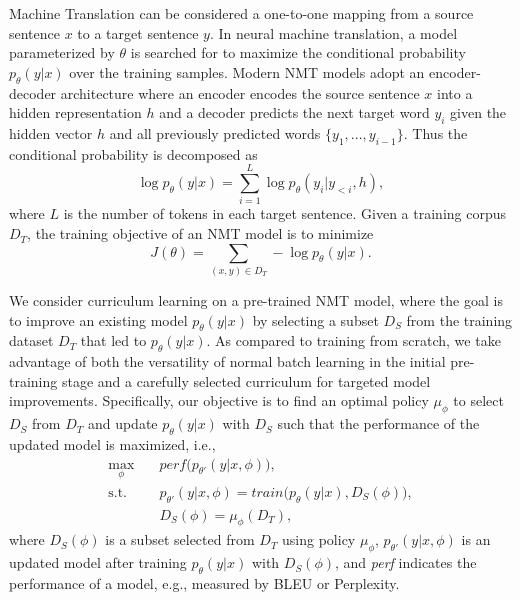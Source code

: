 \documentclass[letterpaper]{article}
\begin{document}
Machine Translation can be considered a one-to-one mapping from a source sentence $x$ to a target sentence $y$. In neural machine translation, a model parameterized by $\theta$ is searched for to maximize the conditional probability $p_\theta(y|x)$ over the training samples.
Modern NMT models adopt an encoder-decoder architecture where an encoder encodes the source sentence $x$ into a hidden representation $h$ and a decoder predicts the next target word $y_i$ given the hidden vector $h$ and all previously predicted words $\{y_1,...,y_{i-1}\}$. Thus the conditional probability is decomposed as
\begin{equation}
	\label{eq:nmtDecompose}
	\log p_\theta(y|x)=\sum_{i=1}^L \log p_\theta(y_i|y_{<i},h),
\end{equation}
where $L$ is the number of tokens in each target sentence. Given a training corpus $D_T$, the training objective of an NMT model is to minimize
\begin{equation}
	\label{eq:nmtObjective}
	J(\theta) = \sum_{(x,y)\in D_T} -\log p_\theta(y|x).
\end{equation}

We consider curriculum learning on a pre-trained NMT model, where the goal is to improve an existing model $p_\theta(y|x)$ by selecting a subset $D_S$ from the training dataset $D_T$ that led to $p_\theta(y|x)$. As compared to training from scratch, we take advantage of both the versatility of normal batch learning in the initial pre-training stage and a carefully selected curriculum for targeted model improvements. 
Specifically, our objective is to find an optimal policy $\mu_\phi$ to select $D_S$ from $D_T$ and update $p_\theta(y|x)$ with $D_S$ such that the performance of the updated model is maximized, i.e., 
\begin{equation}
\begin{aligned}
		\max_\phi &\quad \textit{perf}\Big(p_{\theta'}(y|x,\phi)\Big),\\
		\text{s.t.} & \quad p_{\theta'}(y|x,\phi) = \textit{train}\Big(p_\theta(y|x), D_S(\phi)\Big),\\
		& \quad D_S(\phi) = \mu_\phi(D_T),
\end{aligned} 
\end{equation}
where $D_S(\phi)$ is a subset selected from $D_T$ using policy $\mu_\phi$, $p_{\theta'}(y|x,\phi)$ is an updated model after training $p_\theta(y|x)$ with $D_S(\phi)$, and \textit{perf} indicates the performance of a model, e.g., measured by BLEU or Perplexity.
\end{document}
